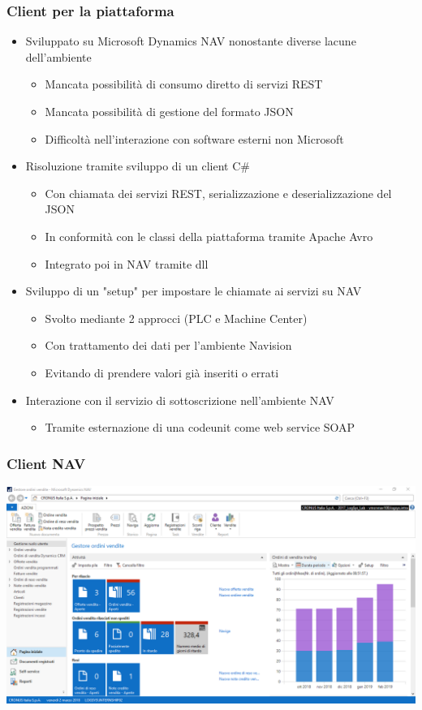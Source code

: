 \documentclass{beamer}
\begin{document}
\begin{frame}
\frametitle{Client per la piattaforma}
\begin{itemize}
\item Sviluppato su Microsoft Dynamics NAV nonostante diverse lacune dell'ambiente
\begin{itemize}
\item Mancata possibilità di consumo diretto di servizi REST
\item Mancata possibilità di gestione del formato JSON
\item Difficoltà nell'interazione con software esterni non Microsoft
\end{itemize}
\item Risoluzione tramite sviluppo di un client C\#
\begin{itemize}
\item Con chiamata dei servizi REST, serializzazione e deserializzazione del JSON
\item In conformità con le classi della piattaforma tramite Apache Avro
\item Integrato poi in NAV tramite dll 
\end{itemize}
\item Sviluppo di un "setup" per impostare le chiamate ai servizi su NAV
\begin{itemize}
\item Svolto mediante 2 approcci (PLC e Machine Center)
\item Con trattamento dei dati per l'ambiente Navision
\item Evitando di prendere valori già inseriti o errati
\end{itemize}

\item Interazione con il servizio di sottoscrizione nell'ambiente NAV
\begin{itemize}
\item Tramite esternazione di una codeunit come web service SOAP
\end{itemize}
\end{itemize}
\end{frame}
\begin{frame}
\frametitle{Client NAV}
\includegraphics[width=1\textwidth]{images/NAVClient.png}
\end{frame}
\end{document}
